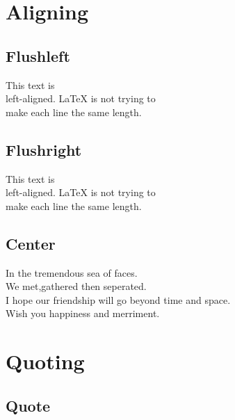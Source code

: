 \section{Aligning}

\subsection{Flushleft}

\begin{flushleft}

This text is\\ left-aligned. \LaTeX{} is not trying to\\ make each
line the same length.

\end{flushleft}

\subsection{Flushright}

\begin{flushright}

This text is\\ left-aligned. \LaTeX{} is not trying to\\ make each
line the same length.

\end{flushright}

\subsection{Center}

\begin{center}

In the tremendous sea of faces.\\

We met,gathered then seperated.\\

I hope our friendship will go beyond time and space.\\

Wish you
happiness and merriment.

\end{center}

\section{Quoting}

\subsection{Quote}

